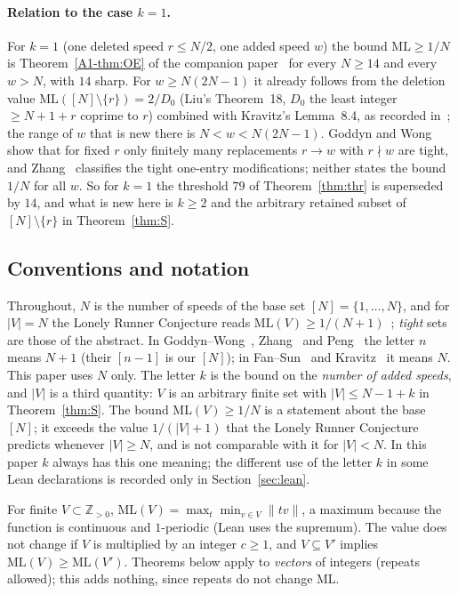 \documentclass[11pt]{article}
\theoremstyle{definition}
\theoremstyle{remark}
\newcommand{\nd}[1]{\lVert #1\rVert}
\newcommand{\ML}{\mathrm{ML}}
\newcommand{\ZZ}{\mathbb{Z}}
\newcommand{\xA}[1]{\ref{A1-#1}}
\begin{document}
\paragraph{Relation to the case $k=1$.}
For $k=1$ (one deleted speed $r\le N/2$, one added speed $w$) the bound $\ML\ge1/N$ is Theorem~\xA{thm:OE} of the companion paper~\cite{A1} for every $N\ge14$ and every $w>N$, with $14$ sharp. For $w\ge N(2N-1)$ it already follows from the deletion value $\ML([N]\setminus\{r\})=2/D_0$ (Liu's Theorem~18, $D_0$ the least integer $\ge N+1+r$ coprime to $r$) combined with Kravitz's Lemma~8.4, as recorded in~\cite[Remark~\xA{rem:L84}]{A1}; the range of $w$ that is new there is $N<w<N(2N-1)$. Goddyn and Wong~\cite[Thm.~2.4]{GW} show that for fixed $r$ only finitely many replacements $r\to w$ with $r\nmid w$ are tight, and Zhang~\cite{Z} classifies the tight one-entry modifications; neither states the bound $1/N$ for all $w$. So for $k=1$ the threshold $79$ of Theorem~\ref{thm:thr} is superseded by $14$, and what is new here is $k\ge2$ and the arbitrary retained subset of $[N]\setminus\{r\}$ in Theorem~\ref{thm:S}.


\subsection{Conventions and notation}\label{sec:conv}
Throughout, $N$ is the number of speeds of the base set $[N]=\{1,\dots,N\}$, and for $|V|=N$ the Lonely Runner Conjecture reads $\ML(V)\ge1/(N+1)$~\cite{W}; \emph{tight} sets are those of the abstract. In Goddyn--Wong~\cite{GW}, Zhang~\cite{Z} and Peng~\cite{P} the letter $n$ means $N+1$ (their $[n-1]$ is our $[N]$); in Fan--Sun~\cite{FS} and Kravitz~\cite{K} it means $N$. This paper uses $N$ only. The letter $k$ is the bound on the \emph{number of added speeds}, and $|V|$ is a third quantity: $V$ is an arbitrary finite set with $|V|\le N-1+k$ in Theorem~\ref{thm:S}. The bound $\ML(V)\ge1/N$ is a statement about the base $[N]$; it exceeds the value $1/(|V|+1)$ that the Lonely Runner Conjecture predicts whenever $|V|\ge N$, and is not comparable with it for $|V|<N$. In this paper $k$ always has this one meaning; the different use of the letter $k$ in some Lean declarations is recorded only in Section~\ref{sec:lean}.

For finite $V\subset\ZZ_{>0}$, $\ML(V)=\max_t\min_{v\in V}\nd{tv}$, a maximum because the function is continuous and $1$-periodic (Lean uses the supremum). The value does not change if $V$ is multiplied by an integer $c\ge1$, and $V\subseteq V'$ implies $\ML(V)\ge\ML(V')$. Theorems below apply to \emph{vectors} of integers (repeats allowed); this adds nothing, since repeats do not change $\ML$.
\end{document}
